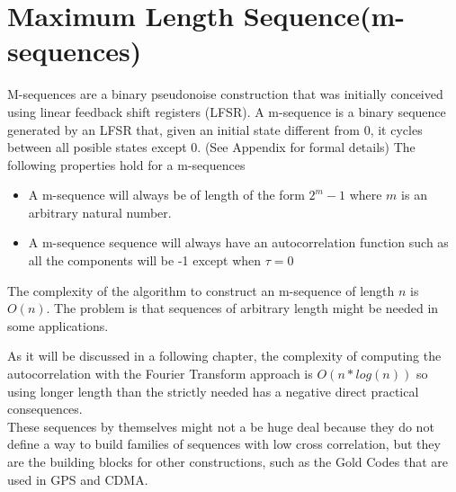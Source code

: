 \section{Maximum Length Sequence(m-sequences)}

M-sequences are a binary pseudonoise construction that was initially conceived using linear feedback shift registers (LFSR). A m-sequence is a binary sequence generated by an LFSR that, given an initial
state different from 0, it cycles between all posible states except 0. (See Appendix for formal details)
The following properties hold for a m-sequences  
\begin{itemize}
\item   A m-sequence will always be of length of the form $2^{m}-1$ where $m$ is an
  arbitrary natural number.
\item A m-sequence sequence will always have an autocorrelation function such as
  all the components will be -1 except when $\tau = 0$
\end{itemize}
The complexity of the algorithm to construct an m-sequence of length $n$ is $O(n)$. The problem is
that sequences of arbitrary length might be needed in some applications.

 As it will be discussed in a following chapter, the complexity of computing the
autocorrelation with the Fourier Transform approach is $O(n*log(n))$ so using longer length than the strictly needed  has a  negative direct practical consequences.\\

These sequences by themselves might not a be huge deal because they do not define a way to build families of sequences with low cross correlation, but they are the
building blocks for other constructions, such as the Gold Codes that are used in GPS and  CDMA.
